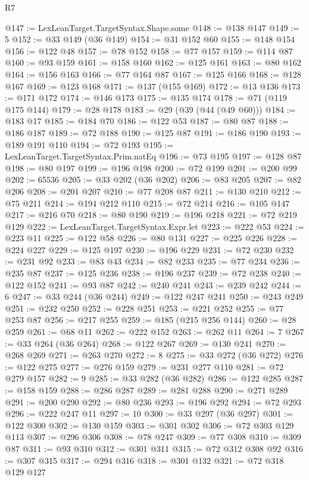 \begin{lexlean}{R7}
\begin{coremodule}
@147 := LexLeanTarget.TargetSyntax.Shape.some
@148 := @138 @147
@149 := 5
@152 := @33 @149 (@36 @149)
@154 := @31 @152 @60
@155 := @148 @154
@156 := @122 @48
@157 := @78 @152
@158 := @77 @157
@159 := @114 @87
@160 := @93 @159
@161 := @158 @160
@162 := @125 @161
@163 := @80 @162
@164 := @156 @163
@166 := @77 @164 @87
@167 := @125 @166
@168 := @128 @167
@169 := @123 @168
@171 := @137 (@155 @169)
@172 := @13 @136
@173 := @171 @172
@174 := @146 @173
@175 := @135 @174
@178 := @71 (@119 @175 @144)
@179 := @28 @178
@183 := @29 (@39 (@44 (@49 @60)))
@184 := @183 @17
@185 := @184 @70
@186 := @122 @53
@187 := @80 @87
@188 := @186 @187
@189 := @72 @188
@190 := @125 @87
@191 := @186 @190
@193 := @189 @191 @110
@194 := @72 @193
@195 := LexLeanTarget.TargetSyntax.Prim.natEq
@196 := @73 @195
@197 := @128 @87
@198 := @80 @197
@199 := @196 @198
@200 := @72 @199
@201 := @200 @99
@202 := 65536
@205 := @33 @202 (@36 @202)
@206 := @83 @205
@207 := @82 @206
@208 := @201 @207
@210 := @77 @208 @87
@211 := @130 @210
@212 := @75 @211
@214 := @194 @212 @110
@215 := @72 @214
@216 := @105 @147
@217 := @216 @70
@218 := @80 @190
@219 := @196 @218
@221 := @72 @219 @129
@222 := LexLeanTarget.TargetSyntax.Expr.let
@223 := @222 @53
@224 := @223 @11
@225 := @122 @58
@226 := @80 @131
@227 := @225 @226
@228 := @224 @227
@229 := @125 @197
@230 := @196 @229
@231 := @72 @230
@232 := @231 @92
@233 := @83 @43
@234 := @82 @233
@235 := @77 @234
@236 := @235 @87
@237 := @125 @236
@238 := @196 @237
@239 := @72 @238
@240 := @122 @152
@241 := @93 @87
@242 := @240 @241
@243 := @239 @242
@244 := 6
@247 := @33 @244 (@36 @244)
@249 := @122 @247 @241
@250 := @243 @249
@251 := @232 @250
@252 := @228 @251
@253 := @221 @252
@255 := @77 @253 @87
@256 := @217 @255
@259 := @185 (@215 @256 @144)
@260 := @28 @259
@261 := @68 @11
@262 := @222 @152
@263 := @262 @11
@264 := 7
@267 := @33 @264 (@36 @264)
@268 := @122 @267
@269 := @130 @241
@270 := @268 @269
@271 := @263 @270
@272 := 8
@275 := @33 @272 (@36 @272)
@276 := @122 @275
@277 := @276 @159
@279 := @231 @277 @110
@281 := @72 @279 @157
@282 := 9
@285 := @33 @282 (@36 @282)
@286 := @122 @285
@287 := @158 @159
@288 := @286 @287
@289 := @281 @288
@290 := @271 @289
@291 := @200 @290
@292 := @80 @236
@293 := @196 @292
@294 := @72 @293
@296 := @222 @247 @11
@297 := 10
@300 := @33 @297 (@36 @297)
@301 := @122 @300
@302 := @130 @159
@303 := @301 @302
@306 := @72 @303 @129 @113
@307 := @296 @306
@308 := @78 @247
@309 := @77 @308
@310 := @309 @87
@311 := @93 @310
@312 := @301 @311
@315 := @72 @312 @308 @92
@316 := @307 @315
@317 := @294 @316
@318 := @301 @132
@321 := @72 @318 @129 @127

\end{coremodule}
\end{lexlean}
